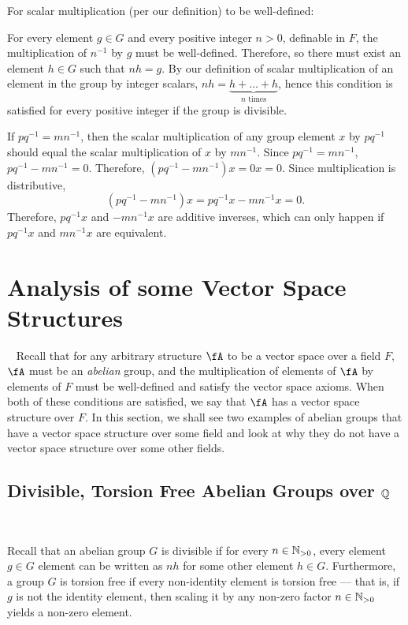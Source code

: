 \step
For scalar multiplication (per our definition) to be well-defined:
\begin{enumarabic}
  \item For every element $g \in G$ and every positive integer $n > 0$,
    definable in $F$, the multiplication of $n^{-1}$ by $g$ must be well-defined.
    Therefore, so there must exist an element $h \in G$ such that
    $n h = g$. By our definition of scalar multiplication of an element in the group
    by integer scalars, $n h = \underbrace{h + \ldots + h}_{\text{$n$ times}}$,
    hence this condition is satisfied for every positive integer if the group is divisible.
  \item If $pq^{-1} = mn^{-1}$, then the scalar multiplication of
    any group element $x$ by $pq^{-1}$ should equal the scalar multiplication of $x$ by $mn^{-1}$.
    Since $pq^{-1} = mn^{-1}$, $pq^{-1} - mn^{-1} = 0.$
    Therefore, $(pq^{-1} - mn^{-1})x = 0x = 0$.
    Since multiplication is distributive,
    \[ (pq^{-1} - mn^{-1})x = pq^{-1}x - mn^{-1}x = 0. \]
    Therefore, $pq^{-1}x$ and $-mn^{-1}x$ are additive inverses, which can only happen
    if $pq^{-1}x$ and $mn^{-1}x$ are equivalent.
\end{enumarabic}


\newpage
\section{Analysis of some Vector Space Structures}~\label{sec:analysis-vec-space-structures}
Recall that for any arbitrary structure $\fA$ to be a vector space over a field $F$,
$\fA$ must be an \emph{abelian} group, and the multiplication of elements of $\fA$
by elements of $F$ must be well-defined and satisfy the vector space axioms.
When both of these conditions are satisfied,
we say that $\fA$ has a vector space structure over $F$.
In this section, we shall see two examples of abelian groups that have a vector space
structure over some field and look at why they do not have a vector space structure
over some other fields.

\subsection{Divisible, Torsion Free Abelian Groups over \texorpdfstring{$\mathbb{Q}$}{Q}}
~\label{sec:div-torsion-free-abelian-groups}

Recall that an abelian group $G$ is divisible if for every $n \in \mathbb{N}_{>0}$,
every element $g \in G$ element can be written as $nh$ for some other element $h \in G$.
Furthermore, a group $G$ is torsion free if every non-identity element is torsion free
--- that is, if $g$ is not the identity element, then scaling it by any non-zero
factor $n \in \mathbb{N}_{>0}$ yields a non-zero element.

